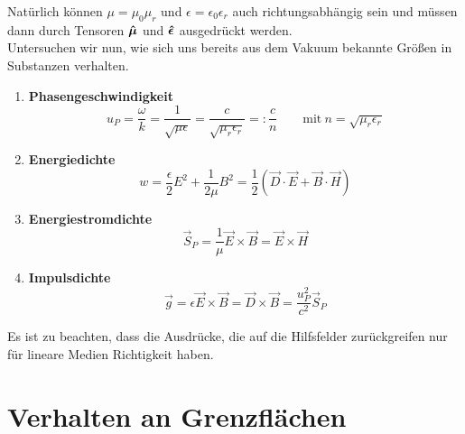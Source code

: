 Natürlich können $\mu=\mu_0\mu_r$ und $\epsilon=\epsilon_0\epsilon_r$ auch richtungsabhängig sein und müssen dann durch Tensoren $\bm{\hat{\mu}}$ und $\bm{\hat{\epsilon}}$ ausgedrückt werden.\\

Untersuchen wir nun, wie sich uns bereits aus dem Vakuum bekannte Größen in Substanzen verhalten.
\begin{enumerate}
		\item \textbf{Phasengeschwindigkeit}
		\begin{equation*}
		u_P=\frac{\omega}{k}=\frac{1}{\sqrt{\mu\epsilon}}=\frac{c}{\sqrt{\mu_r\epsilon_r}} =: \frac{c}{n}\quad\quad\text{mit}\ n=\sqrt{\mu_r\epsilon_r}
		\end{equation*}
		\item \textbf{Energiedichte}
		\begin{equation*}
		w=\frac{\epsilon}{2}E^2 + \frac{1}{2\mu}B^2 = \frac{1}{2}\left(\vec{D}\cdot\vec{E}+\vec{B}\cdot\vec{H}\right)
		\end{equation*}
		\item \textbf{Energiestromdichte}
		\begin{equation*}
		\vec{S}_P = \frac{1}{\mu}\vec{E}\times\vec{B} = \vec{E}\times\vec{H}
		\end{equation*}
		\item \textbf{Impulsdichte}
		\begin{equation*}
		\vec{g}=\epsilon\vec{E}\times\vec{B}=\vec{D}\times\vec{B}=\frac{u_P^2}{c^2}\vec{S}_P
		\end{equation*}
\end{enumerate}
Es ist zu beachten, dass die Ausdrücke, die auf die Hilfsfelder zurückgreifen nur für lineare Medien Richtigkeit haben.
\newpage
\section{Verhalten an Grenzflächen}

